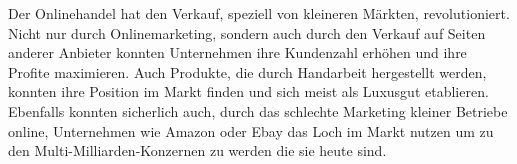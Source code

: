 Der Onlinehandel hat den Verkauf, speziell von kleineren Märkten, revolutioniert. Nicht nur durch Onlinemarketing, sondern auch durch den Verkauf auf Seiten anderer Anbieter konnten Unternehmen ihre Kundenzahl erhöhen und ihre Profite maximieren. Auch Produkte, die durch Handarbeit hergestellt werden, konnten ihre Position im Markt finden und sich meist als Luxusgut etablieren. Ebenfalls konnten sicherlich auch, durch das schlechte Marketing kleiner Betriebe online, Unternehmen wie Amazon oder Ebay das Loch im Markt nutzen um zu den Multi-Milliarden-Konzernen zu werden die sie heute sind.      
